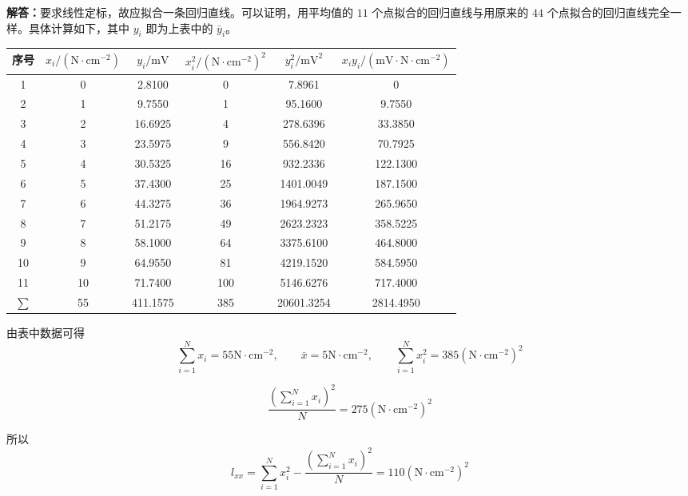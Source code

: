 \documentclass[UTF8,zihao=-4]{ctexart}
\newcommand{\jieda}{\noindent\textbf{解答：}}
\begin{document}
\jieda 要求线性定标，故应拟合一条回归直线。可以证明，用平均值的 $11$ 个点拟合的回归直线与用原来的 $44$ 个点拟合的回归直线完全一样。具体计算如下，其中 $y_i$ 即为上表中的 $\bar{y}_i$。

\begin{center}
\scriptsize
\setlength{\tabcolsep}{5pt}
\begin{tabular}{c|c|c|c|c|c}
\toprule
序号 & $x_i/(\mathrm{N}\cdot\mathrm{cm}^{-2})$ & $y_i/\mathrm{mV}$ & $x_i^2/(\mathrm{N}\cdot\mathrm{cm}^{-2})^2$ & $y_i^2/\mathrm{mV}^2$ & $x_i y_i/(\mathrm{mV}\cdot\mathrm{N}\cdot\mathrm{cm}^{-2})$\\
\midrule
1 & 0  & 2.8100 & 0 & 7.8961 & 0\\
2 & 1  & 9.7550 & 1 & 95.1600 & 9.7550\\
3 & 2  & 16.6925 & 4 & 278.6396 & 33.3850\\
4 & 3  & 23.5975 & 9 & 556.8420 & 70.7925\\
5 & 4  & 30.5325 & 16 & 932.2336 & 122.1300\\
6 & 5  & 37.4300 & 25 & 1401.0049 & 187.1500\\
7 & 6  & 44.3275 & 36 & 1964.9273 & 265.9650\\
8 & 7  & 51.2175 & 49 & 2623.2323 & 358.5225\\
9 & 8  & 58.1000 & 64 & 3375.6100 & 464.8000\\
10 & 9 & 64.9550 & 81 & 4219.1520 & 584.5950\\
11 & 10 & 71.7400 & 100 & 5146.6276 & 717.4000\\
\midrule
$\sum$ & 55 & 411.1575 & 385 & 20601.3254 & 2814.4950\\
\bottomrule
\end{tabular}
\end{center}

由表中数据可得
\begin{equation*}
    \sum_{i=1}^{N}x_i=55\mathrm{N}\cdot\mathrm{cm}^{-2}, \qquad \bar{x}=5\mathrm{N}\cdot\mathrm{cm}^{-2}, \qquad \sum_{i=1}^{N}x_i^2=385(\mathrm{N}\cdot\mathrm{cm}^{-2})^2
\end{equation*}

\begin{equation*}
    \frac{\left(\displaystyle\sum_{i=1}^{N}x_i\right)^2}{N} = 275(\mathrm{N}\cdot\mathrm{cm}^{-2})^2
\end{equation*}

所以
\begin{equation*}
    l_{xx} = \sum_{i=1}^{N}x_i^2 - \frac{\left(\displaystyle\sum_{i=1}^{N}x_i\right)^2}{N} = 110(\mathrm{N}\cdot\mathrm{cm}^{-2})^2
\end{equation*}
\end{document}
